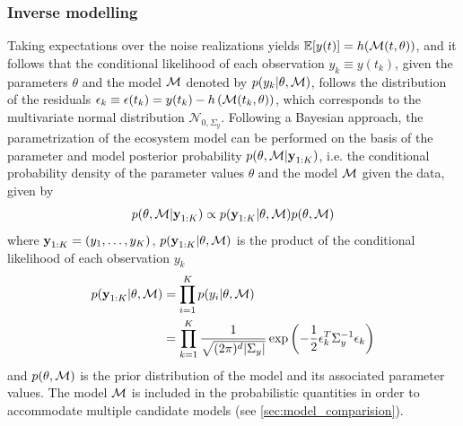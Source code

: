 \subsubsection{Inverse modelling}
Taking expectations over the noise realizations yields $ {\mathbb{E}} [y(t)] = h(\mathcal{M}(t,\theta))$, and it follows that the conditional likelihood of each observation $y_k \equiv y(t_k)$, given the parameters $\theta$ and the model $\mathcal{M}$ denoted by $p( y_k | \theta, \mathcal{M} )$, follows the distribution of the residuals $\epsilon_k \equiv \epsilon(t_k) = y(t_k) - h\left(\mathcal{M}(t_k, \theta)\right)$, which corresponds to the multivariate normal distribution $\mathcal{N}_{0, \Sigma_y}$.
%
Following a Bayesian approach, the parametrization of the ecosystem model can be performed on the basis of the parameter and model posterior probability $p(\theta, \mathcal{M} | \textbf{y}_{1:K})$, i.e. the conditional probability density of the parameter values $\theta$ and the model $\mathcal{M}$ given the data, given by 
\begin{equation}
    p(\theta, \mathcal{M} | \textbf{y}_{1:K}) \propto p(\textbf{y}_{1:K} | \theta, \mathcal{M}) p(\theta, \mathcal{M})
\end{equation}
where $\textbf{y}_{1:K} = (y_1,\dots,y_K)$, $p(\textbf{y}_{1:K} | \theta, \mathcal{M})$ is the product of the conditional likelihood of each observation $y_k$
\begin{equation}
\begin{split}
    p(\textbf{y}_{1:K} | \theta, \mathcal{M}) &= \prod_{i=1}^K p(y_{i} | \theta, \mathcal{M})\\
                        &= \prod_{k=1}^K \frac{1}{\sqrt{(2\pi)^d|\Sigma_y|}} \exp \left(-\frac{1}{2} \epsilon_k^{T} \Sigma_y^{-1} \epsilon_k \right)
\end{split}
\end{equation}
and $p(\theta,\mathcal{M})$ is the prior distribution of the model and its associated parameter values. The model $\mathcal{M}$ is included in the probabilistic quantities in order to accommodate multiple candidate models (see \cref{sec:model_comparision}).

